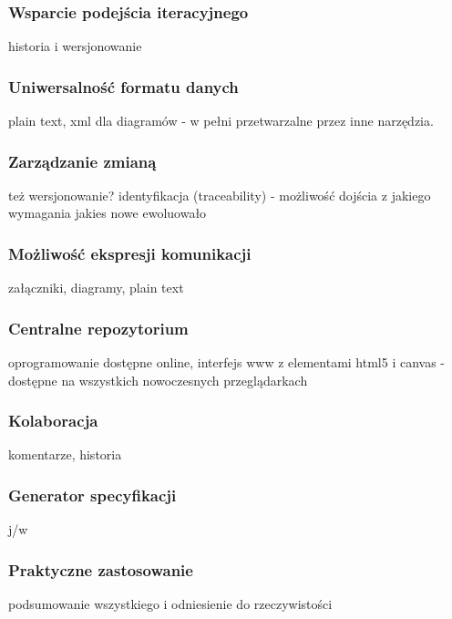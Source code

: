     \subsubsection{Wsparcie podejścia iteracyjnego}
      historia i wersjonowanie
    \subsubsection{Uniwersalność formatu danych}
      plain text, xml dla diagramów - w pełni przetwarzalne przez inne narzędzia. 
    \subsubsection{Zarządzanie zmianą}
      też wersjonowanie? identyfikacja (traceability) - możliwość dojścia z jakiego wymagania jakies nowe ewoluowało
    \subsubsection{Możliwość ekspresji komunikacji}
      załączniki, diagramy, plain text
    \subsubsection{Centralne repozytorium}
      oprogramowanie dostępne online, interfejs www z elementami html5 i canvas - dostępne na wszystkich nowoczesnych przeglądarkach
    \subsubsection{Kolaboracja}
      komentarze, historia
    \subsubsection{Generator specyfikacji}
      j/w
    \subsubsection{Praktyczne zastosowanie}
      podsumowanie wszystkiego i odniesienie do rzeczywistości
